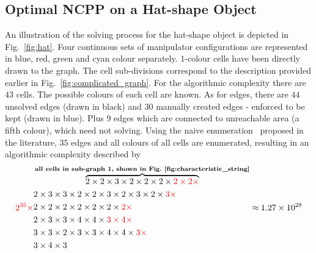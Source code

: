 \documentclass[journal]{IEEEtran}
\begin{document}
\subsection{Optimal NCPP on a Hat-shape Object}
An illustration of the solving process for the hat-shape object is depicted in Fig.~\ref{fig:hat}. 
Four continuous sets of manipulator configurations are represented in blue, red, green and cyan colour separately. $1$-colour cells have been directly drawn to the graph. 
The cell sub-divisions correspond to the description provided earlier in Fig.~\ref{fig:complicated_graph}.
For the algorithmic complexity there are $43$ cells. The possible colours of each cell are known. As for edges, there are $44$ unsolved edges (drawn in black) and $30$ manually created edges - enforced to be kept (drawn in blue). Plus $9$ edges which are connected to unreachable area (a fifth colour), which need not solving. Using the naive enumeration~\cite{Yang2020Cellular} proposed in the literature, %
$35$ edges and all colours of all cells are enumerated, resulting in an algorithmic complexity described by 
\begin{equation}
{\color{red}2^{35}\times}
\begin{aligned}
&\overbrace{2\times2\times3\times2\times2\times2\times{\color{red}2\times2\times}}^{\textbf{all cells in sub-graph 1, shown in Fig.~\ref{fig:characteristic_string}}}\\
&2\times3\times3\times2\times2\times3\times2\times3\times2\times{\color{red}3\times}\\
&2\times2\times2\times2\times2\times2\times{\color{red}2\times}\\
&2\times3\times3\times4\times4\times{\color{red}3\times4\times}\\
&3\times3\times2\times3\times3\times4\times4\times{\color{red}3\times}\\
&3\times4\times3
\end{aligned}
\approx 1.27\times10^{28}
\end{equation}
\end{document}
